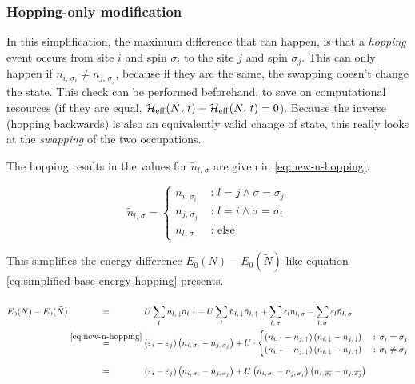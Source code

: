 \subsubsection*{Hopping-only modification}

In this simplification, the maximum difference that can happen, is that a \emph{hopping} event occurs from site $i$ and spin $\sigma_i$ to the site $j$ and spin $\sigma_j$. 
This can only happen if $n_{i,\,\sigma_i} \neq n_{j,\,\sigma_j}$, because if they are the same, the swapping doesn't change the state. 
This check can be performed beforehand, to save on computational resources (if they are equal, $\HeffOft[\tilde{N}]-\HeffOft[N] = 0$).
Because the inverse (hopping backwards) is also an equivalently valid change of state, this really looks at the \emph{swapping} of the two occupations.

The hopping results in the values for $\tilde{n}_{l,\,\sigma}$ are given in \autoref{eq:new-n-hopping}.

\begin{equation}
    \label{eq:new-n-hopping}
    \tilde{n}_{l,\,\sigma} = \begin{cases}
        n_{i,\,\sigma_i}&\text{ : } l = j \land \sigma = \sigma_j   \\
        n_{j,\,\sigma_j}&\text{ : } l = i \land \sigma = \sigma_i   \\
        n_{l,\,\sigma} &\text{ : else}
    \end{cases}
\end{equation}

This simplifies the energy difference $E_0(N)-E_0(\tilde{N})$ like equation \autoref{eq:simplified-base-energy-hopping} presents.

\begin{equation}
    \label{eq:simplified-base-energy-hopping}
    \begin{split}
        E_0(N)-E_0(\tilde{N}) 
        &\stackrel{\phantom{\ref{eq:new-n-hopping}}}{=} U\lsum n_{l,\,\down}n_{l,\,\up}-U\lsum \tilde{n}_{l,\,\down}\tilde{n}_{l,\,\up} 
        + \lsum[l,\,\sigma] \epsl n_{l,\,\sigma} - \lsum[l,\,\sigma] \epsl \tilde{n}_{l,\,\sigma}\\
        &\stackrel{\ref{eq:new-n-hopping}}{=} \left(\epsl[i]-\epsl[j]\right)\left(n_{i,\,\sigma_i} - n_{j,\,\sigma_j}\right) +
        U\cdot \begin{cases}
            \left(n_{i,\,\up}-n_{j,\,\up}\right) \left(n_{i,\,\down}-n_{j,\,\down}\right) &\text{ : } \sigma_i = \sigma_j   \\
            \left(n_{i,\,\up}-n_{j,\,\down}\right) \left(n_{i,\,\down}-n_{j,\,\up}\right) &\text{ : } \sigma_i \neq \sigma_j
        \end{cases}\\
        &\stackrel{\phantom{\ref{eq:new-n-hopping}}}{=} \left(\epsl[i]-\epsl[j]\right)\left(n_{i,\,\sigma_i} - n_{j,\,\sigma_j}\right) +
        U \left(n_{i,\,\sigma_i}-n_{j,\,\sigma_j}\right) \left(n_{i,\,\overline{\sigma_i}}-n_{j,\,\overline{\sigma_j}}\right)
    \end{split}
\end{equation}

